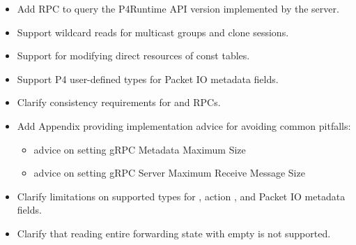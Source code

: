\documentclass[11pt]{article}
\begin{document}
{\begin{itemize}[noitemsep,topsep=\mdcompacttopsep]
\item{}Add  RPC to query the P4Runtime API version implemented by the
server.%

\item{}Support wildcard reads for multicast groups and clone sessions.%

\item{}Support for modifying direct resources of const tables.%

\item{}Support P4 user-defined types for Packet IO metadata fields.%

\item{}Clarify consistency requirements for  and  RPCs.%

\item{}Add Appendix providing implementation advice for avoiding common pitfalls:

\begin{itemize}[noitemsep,topsep=\mdcompacttopsep]%

\item{}advice on setting gRPC Metadata Maximum Size%

\item{}advice on setting gRPC Server Maximum Receive Message Size%
\end{itemize}%

\item{}Clarify limitations on supported types for , action , and
Packet IO metadata fields.%

\item{}Clarify that reading entire forwarding state with empty  is not
supported.%


\end{itemize}}
\end{document}
